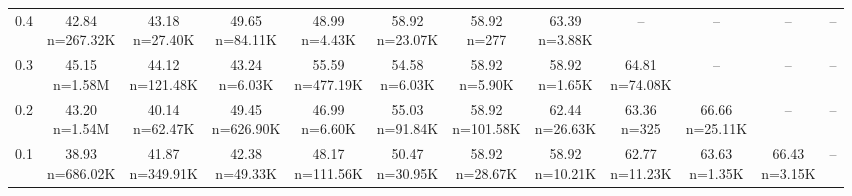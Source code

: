 \begin{table}
\begin{tabular}{lccccccccccc}
0.4 & \makecell{42.84 \\ \scriptsize n=267.32K} & \makecell{43.18 \\ \scriptsize n=27.40K} & \makecell{49.65 \\ \scriptsize n=84.11K} & \makecell{48.99 \\ \scriptsize n=4.43K} & \makecell{58.92 \\ \scriptsize n=23.07K} & \makecell{58.92 \\ \scriptsize n=277} & \makecell{63.39 \\ \scriptsize n=3.88K} & -- & -- & -- & -- \\
0.3 & \makecell{45.15 \\ \scriptsize n=1.58M} & \makecell{44.12 \\ \scriptsize n=121.48K} & \makecell{43.24 \\ \scriptsize n=6.03K} & \makecell{55.59 \\ \scriptsize n=477.19K} & \makecell{54.58 \\ \scriptsize n=6.03K} & \makecell{58.92 \\ \scriptsize n=5.90K} & \makecell{58.92 \\ \scriptsize n=1.65K} & \makecell{64.81 \\ \scriptsize n=74.08K} & -- & -- & -- \\
0.2 & \makecell{43.20 \\ \scriptsize n=1.54M} & \makecell{40.14 \\ \scriptsize n=62.47K} & \makecell{49.45 \\ \scriptsize n=626.90K} & \makecell{46.99 \\ \scriptsize n=6.60K} & \makecell{55.03 \\ \scriptsize n=91.84K} & \makecell{58.92 \\ \scriptsize n=101.58K} & \makecell{62.44 \\ \scriptsize n=26.63K} & \makecell{63.36 \\ \scriptsize n=325} & \makecell{66.66 \\ \scriptsize n=25.11K} & -- & -- \\
0.1 & \makecell{38.93 \\ \scriptsize n=686.02K} & \makecell{41.87 \\ \scriptsize n=349.91K} & \makecell{42.38 \\ \scriptsize n=49.33K} & \makecell{48.17 \\ \scriptsize n=111.56K} & \makecell{50.47 \\ \scriptsize n=30.95K} & \makecell{58.92 \\ \scriptsize n=28.67K} & \makecell{58.92 \\ \scriptsize n=10.21K} & \makecell{62.77 \\ \scriptsize n=11.23K} & \makecell{63.63 \\ \scriptsize n=1.35K} & \makecell{66.43 \\ \scriptsize n=3.15K} & -- \\

\end{tabular}
\end{table}
